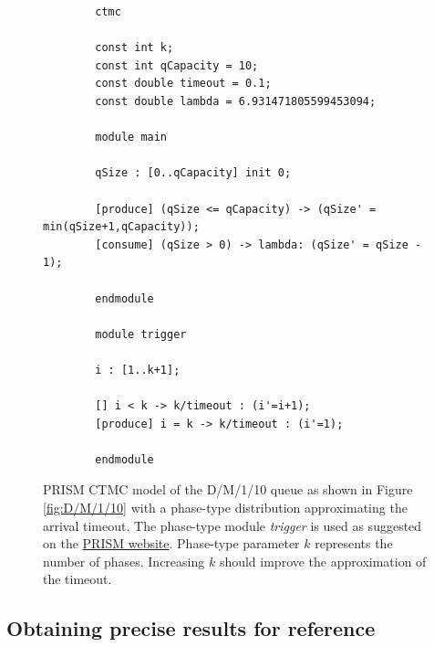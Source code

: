 \documentclass{article}
\numberwithin{equation}{section}		%
\numberwithin{figure}{section}			%
\numberwithin{table}{section}				%
\begin{document}
	\begin{figure}[H]
		\begin{lstlisting}
		ctmc
		
		const int k;
		const int qCapacity = 10;
		const double timeout = 0.1;
		const double lambda = 6.931471805599453094;
		
		module main
		
		qSize : [0..qCapacity] init 0;
		
		[produce] (qSize <= qCapacity) -> (qSize' = min(qSize+1,qCapacity));
		[consume] (qSize > 0) -> lambda: (qSize' = qSize - 1);
		
		endmodule
		
		module trigger
		
		i : [1..k+1];
		
		[] i < k -> k/timeout : (i'=i+1);
		[produce] i = k -> k/timeout : (i'=1);
		
		endmodule
		\end{lstlisting}
		\caption{PRISM CTMC model of the D/M/1/10 queue as shown in Figure \ref{fig:D/M/1/10} with a phase-type distribution approximating the arrival timeout. The phase-type module \emph{trigger} is used as suggested on the \href{http://www.prismmodelchecker.org/manual/FrequentlyAskedQuestions/PRISMModelling}{PRISM website}. Phase-type parameter $k$ represents the number of phases. Increasing $k$ should improve the approximation of the timeout. }
		\label{fig:D/M/1/10_PRISM}
	\end{figure}
	
	\subsection{Obtaining precise results for reference}
	\label{reference}
	
	 
	
	 
\end{document}
